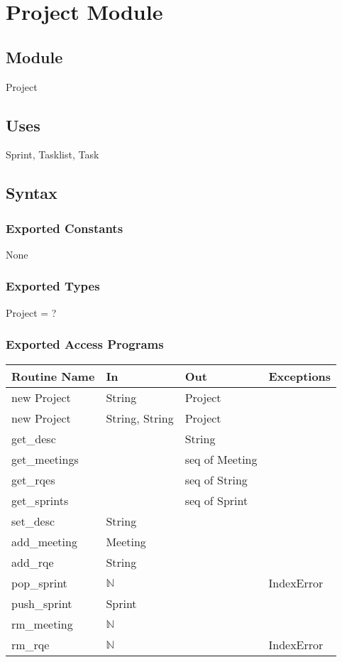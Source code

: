 \documentclass[12pt, titlepage]{article}
\begin{document}
\newpage

\section* {Project Module}

\subsection*{Module}
Project

\subsection* {Uses}
Sprint, Tasklist, Task

\subsection* {Syntax}
\subsubsection* {Exported Constants}
None

\subsubsection* {Exported Types}
Project = ?

\subsubsection* {Exported Access Programs}
\begin{tabular}{|l|l|l|l|}
    \hline
    \textbf{Routine Name} & \textbf{In} & \textbf{Out} & \textbf{Exceptions} \\
    \hline
    new Project & String & Project & \\
    \hline
    new Project & String, String & Project & \\
    \hline
    get\_desc & & String &\\
    \hline
    get\_meetings & & seq of Meeting &\\
    \hline
    get\_rqes & & seq of String & \\
    \hline
    get\_sprints & & seq of Sprint & \\
    \hline
    set\_desc & String & &\\
    \hline
    add\_meeting & Meeting & & \\
    \hline
    add\_rqe & String & & \\
    \hline
    pop\_sprint & $\mathbb{N}$ & & IndexError\\
    \hline
    push\_sprint & Sprint & & \\
    \hline
    rm\_meeting & $\mathbb{N}$ &  &\\
    \hline
    rm\_rqe & $\mathbb{N}$ &  & IndexError\\
    \hline
\end{tabular}
\end{document}
